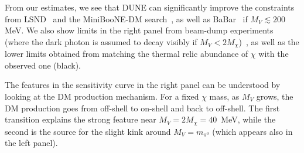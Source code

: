  From our estimates, we see that DUNE can significantly improve the constraints from LSND~\cite{deNiverville:2018dbu} and the MiniBooNE-DM search~\cite{Aguilar-Arevalo:2018wea}, as well as BaBar~\cite{Lees:2017lec} if $M_V \lesssim 200$ MeV. We also show limits in the right panel from beam-dump experiments (where the dark photon is assumed to decay visibly if $M_V < 2 M_\chi$)~\cite{Davier:1989wz,Batley:2015lha,Bjorken:1988as,Riordan:1987aw,Bjorken:2009mm,Bross:1989mp}, as well as the lower limits obtained from matching the thermal relic abundance of $\chi$ with the observed one (black).

The features in the sensitivity curve in the right panel can be understood by looking at the DM production mechanism.
For a fixed $\chi$ mass, as $M_V$ grows, the DM production goes from off-shell to on-shell and back to off-shell. The first transition explains the strong feature near $M_V=2M_\chi = 40$~MeV, while the second is the source for the slight kink around $M_V=m_{\pi^0}$ (which appears also in the left panel).






